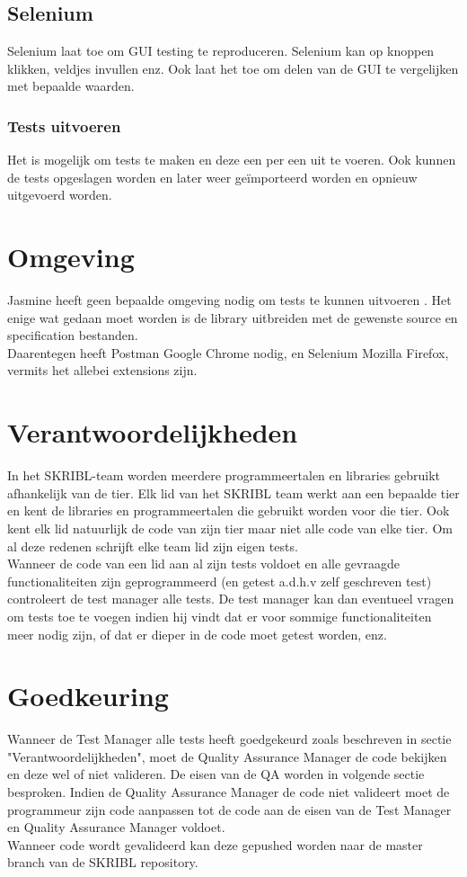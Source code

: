 \documentclass{article}
\begin{document}
\subsection{Selenium}
Selenium laat toe om GUI testing te reproduceren. Selenium kan op knoppen klikken, veldjes invullen enz. Ook laat het toe om delen van de GUI te vergelijken met bepaalde waarden. 
%
\subsubsection{Tests uitvoeren}
Het is mogelijk om tests te maken en deze een per een uit te voeren. Ook kunnen de tests opgeslagen worden en later weer ge\"importeerd worden en opnieuw uitgevoerd worden. 
%
\section{Omgeving}
Jasmine heeft geen bepaalde omgeving nodig om tests te kunnen uitvoeren . Het enige wat gedaan moet worden is de library uitbreiden met de gewenste source en specification bestanden.
\\
Daarentegen heeft Postman Google Chrome nodig, en Selenium Mozilla Firefox, vermits het allebei extensions zijn.
%
\section{Verantwoordelijkheden}
In het SKRIBL-team worden meerdere programmeertalen en libraries gebruikt afhankelijk van de tier. Elk lid van het SKRIBL team werkt aan een bepaalde tier en kent de libraries en programmeertalen die gebruikt worden voor die tier. Ook kent elk lid natuurlijk de code van zijn tier maar niet alle code van elke tier. Om al deze redenen schrijft elke team lid zijn eigen tests.\\
Wanneer de code van een lid aan al zijn tests voldoet en alle gevraagde functionaliteiten zijn geprogrammeerd (en getest a.d.h.v zelf geschreven test) controleert de test manager alle tests. De test manager kan dan eventueel vragen om tests toe te voegen indien hij vindt dat er voor sommige functionaliteiten meer nodig zijn, of dat er dieper in de code moet getest worden, enz.
%
\section{Goedkeuring}
Wanneer de Test Manager alle tests heeft goedgekeurd zoals beschreven in sectie "Verantwoordelijkheden", moet de Quality Assurance Manager de code bekijken en deze wel of niet valideren. De eisen van de QA worden in volgende sectie besproken. Indien de Quality Assurance Manager de code niet valideert moet de programmeur zijn code aanpassen tot de code aan de eisen van de Test Manager en Quality Assurance Manager voldoet. 
\\
Wanneer code wordt gevalideerd kan deze gepushed worden naar de master branch van de SKRIBL repository.
%
\end{document}
